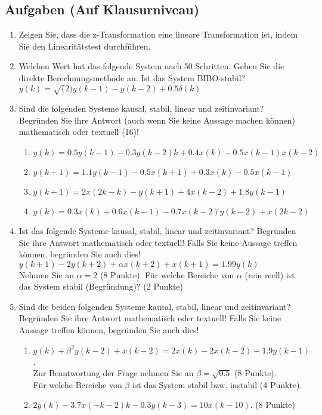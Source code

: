 \subsection{Aufgaben (Auf Klausurniveau)\label{Aufg:zTrafo:Klausurniveau}}
\begin{enumerate}
    \item Zeigen Sie, dass die z-Transformation eine lineare Transformation ist, indem
    Sie den Linearitätstest durchführen.
    \item \label{Aufg:zTrafo:zTrafo}Welchen Wert hat das folgende System nach 50 Schritten. Geben Sie die direkte
    Berechnungsmethode an. Ist das System BIBO-stabil?\\
    $y(k) = \sqrt(2) y(k-1) -  y(k-2) + 0.5 \delta(k)$
    \item Sind die folgenden Systeme kausal, stabil, linear und
    zeitinvariant? Begründen Sie ihre Antwort (auch wenn Sie keine Aussage machen können) mathematisch oder
    textuell (16)!
    \begin{enumerate}
        \item $y(k) = 0.5 y(k-1) - 0.3 y(k-2) k + 0.4 x(k) - 0.5
        x(k-1)x(k-2)$
        \item $y(k+1) = 1.1 y(k-1) - 0.5 x(k+1) + 0.3 x(k) - 0.5
        x(k-1)$
        \item $y(k+1) = 2x(2k-k) - y(k+1) + 4 x(k-2) + 1.8 y(k-1)$
        \item $y(k) = 0.3 x(k) + 0.6x(k-1) - 0.7 x(k-2)y(k-2) + x(2k-2)$
    \end{enumerate}
    \item Ist das folgende Systeme kausal, stabil, linear und
    zeitinvariant? Begründen Sie ihre Antwort mathematisch oder
    textuell! Falls Sie keine Aussage treffen können, begründen Sie auch dies!
    $y(k+1) - 2y(k+2) + \alpha x(k+2) + x(k+1) =  1.99 y(k)$\\
    Nehmen Sie an $\alpha = 2$ (8 Punkte). Für welche Bereiche von $\alpha$ (rein reell)
    ist das System stabil (Begründung)? (2 Punkte)
    \item Sind die beiden folgenden Systeme kausal, stabil, linear und
    zeitinvariant? Begründen Sie ihre Antwort mathematisch oder
    textuell! Falls Sie keine Aussage treffen können, begründen Sie auch dies!
    \begin{enumerate}
    \item $y(k) + \beta^2 y(k-2) + x(k-2) = 2 x(k) - 2x(k-2) - 1.9
    y(k-1)$.\\
    Zur Beantwortung der Frage nehmen Sie an $\beta = \sqrt{0.5}$ (8 Punkte).\\
    Für welche Bereiche von $\beta$ ist das System stabil bzw.
    instabil (4 Punkte).
    \item $2y(k) - 3.7x(-k-2)k -0.3y(k-3) = 10x(k-10)$. (8 Punkte)
    \end{enumerate}

\end{enumerate}

